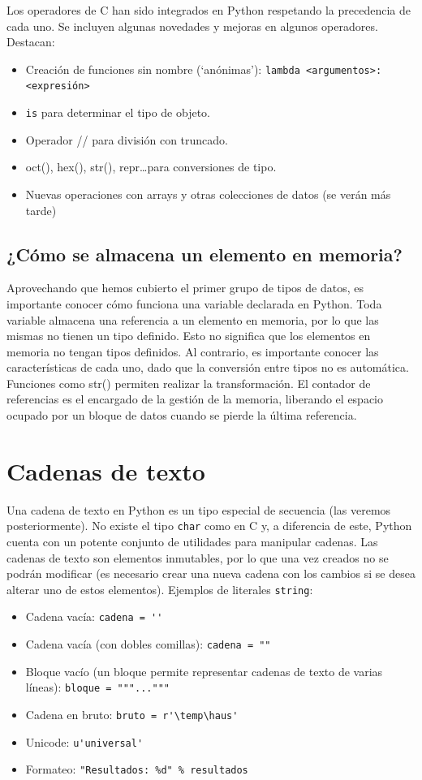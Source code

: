 \documentclass[12pt]{article} %
\begin{document}
Los operadores de C han sido integrados en Python respetando la precedencia de cada uno. Se incluyen algunas novedades y mejoras en algunos operadores. Destacan:
\begin{itemize}
	\item Creación de funciones sin nombre (`anónimas'): \verb+lambda <argumentos>: <expresión>+
	\item \verb+is+ para determinar el tipo de objeto.
	\item Operador // para división con truncado.
	\item oct(), hex(), str(), repr\dots para conversiones de tipo.
	\item Nuevas operaciones con arrays y otras colecciones de datos (se verán más tarde)
\end{itemize}

\subsection{¿Cómo se almacena un elemento en memoria?}

Aprovechando que hemos cubierto el primer grupo de tipos de datos, es importante conocer cómo funciona una variable declarada en Python. Toda variable almacena una referencia a un elemento en memoria, por lo que las mismas no tienen un tipo definido. Esto no significa que los elementos en memoria no tengan tipos definidos. Al contrario, es importante conocer las características de cada uno, dado que la conversión entre tipos no es automática. Funciones como str() permiten realizar la transformación.
El contador de referencias es el encargado de la gestión de la memoria, liberando el espacio ocupado por un bloque de datos cuando se pierde la última referencia.
\section{Cadenas de texto}

Una cadena de texto en Python es un tipo especial de secuencia (las veremos posteriormente). No existe el tipo \verb+char+ como en C y, a diferencia de este, Python cuenta con un potente conjunto de utilidades para manipular cadenas.
Las cadenas de texto son elementos inmutables, por lo que una vez creados no se podrán modificar (es necesario crear una nueva cadena con los cambios si se desea alterar uno de estos elementos).
Ejemplos de literales \verb+string+:
\begin{itemize}
	\item Cadena vacía: \verb+cadena = ''+
	\item Cadena vacía (con dobles comillas): \verb+cadena = ""+
	\item Bloque vacío (un bloque permite representar cadenas de texto de varias líneas): \verb+bloque = """..."""+
	\item Cadena en bruto: \verb+bruto = r'\temp\haus'+
	\item Unicode: \verb+u'universal'+
	\item Formateo: \verb+"Resultados: %d" % resultados+
\end{itemize}
\end{document}
